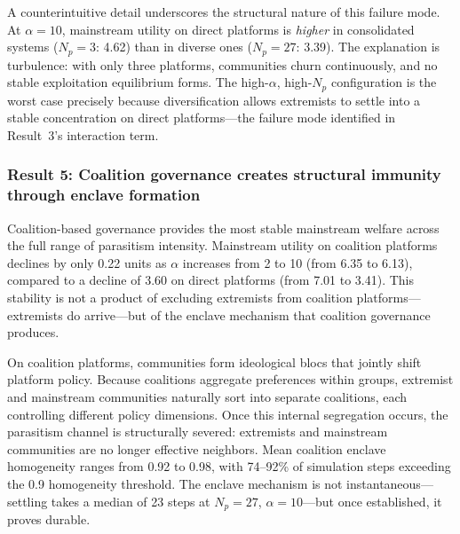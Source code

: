 A counterintuitive detail underscores the structural nature of this failure mode. At $\alpha = 10$, mainstream utility on direct platforms is \textit{higher} in consolidated systems ($N_p = 3$: 4.62) than in diverse ones ($N_p = 27$: 3.39). The explanation is turbulence: with only three platforms, communities churn continuously, and no stable exploitation equilibrium forms. The high-$\alpha$, high-$N_p$ configuration is the worst case precisely because diversification allows extremists to settle into a stable concentration on direct platforms---the failure mode identified in Result~3's interaction term.


\subsubsection{Result 5: Coalition governance creates structural immunity through enclave formation}

Coalition-based governance provides the most stable mainstream welfare across the full range of parasitism intensity. Mainstream utility on coalition platforms declines by only 0.22 units as $\alpha$ increases from 2 to 10 (from 6.35 to 6.13), compared to a decline of 3.60 on direct platforms (from 7.01 to 3.41). This stability is not a product of excluding extremists from coalition platforms---extremists do arrive---but of the enclave mechanism that coalition governance produces.

On coalition platforms, communities form ideological blocs that jointly shift platform policy. Because coalitions aggregate preferences within groups, extremist and mainstream communities naturally sort into separate coalitions, each controlling different policy dimensions. Once this internal segregation occurs, the parasitism channel is structurally severed: extremists and mainstream communities are no longer effective neighbors. Mean coalition enclave homogeneity ranges from 0.92 to 0.98, with 74--92\% of simulation steps exceeding the 0.9 homogeneity threshold. The enclave mechanism is not instantaneous---settling takes a median of 23 steps at $N_p = 27$, $\alpha = 10$---but once established, it proves durable.

